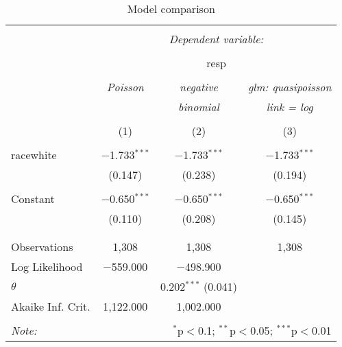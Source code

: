 
\begin{table}[!htbp] \centering 
  \caption{Model comparison} 
  \label{} 
\small 
\begin{tabular}{@{\extracolsep{5pt}}lccc} 
\\[-1.8ex]\hline 
\hline \\[-1.8ex] 
 & \multicolumn{3}{c}{\textit{Dependent variable:}} \\ 
\cline{2-4} 
\\[-1.8ex] & \multicolumn{3}{c}{resp} \\ 
\\[-1.8ex] & \textit{Poisson} & \textit{negative} & \textit{glm: quasipoisson} \\ 
 & \textit{} & \textit{binomial} & \textit{link = log} \\ 
\\[-1.8ex] & (1) & (2) & (3)\\ 
\hline \\[-1.8ex] 
 racewhite & $-$1.733$^{***}$ & $-$1.733$^{***}$ & $-$1.733$^{***}$ \\ 
  & (0.147) & (0.238) & (0.194) \\ 
  & & & \\ 
 Constant & $-$0.650$^{***}$ & $-$0.650$^{***}$ & $-$0.650$^{***}$ \\ 
  & (0.110) & (0.208) & (0.145) \\ 
  & & & \\ 
\hline \\[-1.8ex] 
Observations & 1,308 & 1,308 & 1,308 \\ 
Log Likelihood & $-$559.000 & $-$498.900 &  \\ 
$\theta$ &  & 0.202$^{***}$  (0.041) &  \\ 
Akaike Inf. Crit. & 1,122.000 & 1,002.000 &  \\ 
\hline 
\hline \\[-1.8ex] 
\textit{Note:}  & \multicolumn{3}{r}{$^{*}$p$<$0.1; $^{**}$p$<$0.05; $^{***}$p$<$0.01} \\ 
\end{tabular} 
\end{table} 
